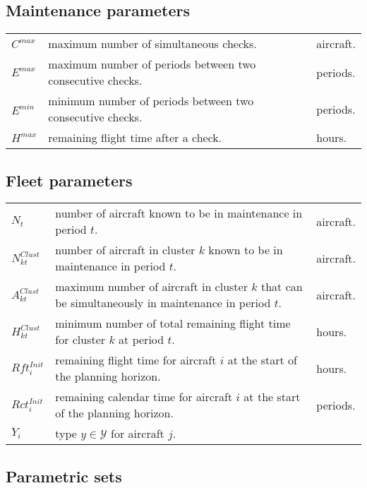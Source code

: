 \documentclass[a4paper,onecolumn,fleqn]{article}
\begin{document}
    \subsection{Maintenance parameters}

        \begin{tabular}{p{15mm}p{125mm}p{15mm}}
            $C^{max}$         & maximum number of simultaneous checks. & aircraft. \\
            $E^{max}$         & maximum number of periods between two consecutive checks. & periods. \\
            $E^{min}$         & minimum number of periods between two consecutive checks. & periods. \\
            $H^{max}$         & remaining flight time after a check. & hours. \\
        \end{tabular}

    \subsection{Fleet parameters}

        \begin{tabular}{p{15mm}p{125mm}p{15mm}}
            $N_t$               & number of aircraft known to be in maintenance in period $t$. & aircraft. \\
            $N^{Clust}_{kt}$    & number of aircraft in cluster $k$ known to be in maintenance in period $t$. & aircraft. \\
            $A^{Clust}_{kt}$    & maximum number of aircraft in cluster $k$ that can be simultaneously in maintenance in period $t$. & aircraft. \\
            $H^{Clust}_{kt}$    & minimum number of total remaining flight time for cluster $k$ at period $t$. & hours. \\
            $Rft^{Init}_i$      & remaining flight time for aircraft $i$ at the start of the planning horizon.  & hours.  \\
            $Rct^{Init}_i$      & remaining calendar time for aircraft $i$ at the start of the planning horizon.  & periods. \\
            $Y_i$               & type $y \in \mathcal{Y}$ for aircraft $j$. \\
        \end{tabular}

    \subsection{Parametric sets}
\end{document}
